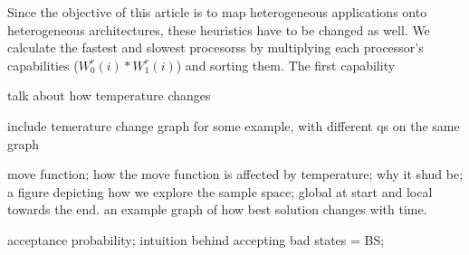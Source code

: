 Since the objective of this article is to map heterogeneous applications onto
heterogeneous architectures, these heuristics have to be changed as well. We
calculate the fastest and slowest procesorss by multiplying each processor's
capabilities ($W^r_0(i) * W^r_1(i)$) and sorting them. The first capability 

talk about how temperature changes

include temerature change graph for some example, with different qs on the same
graph

move function; how the move function is affected by temperature; why it shud be;
a figure depicting how we explore the sample space; global at start and local
towards the end.
an example graph of how best solution changes with time.

acceptance probability; intuition behind accepting bad states = BS;

